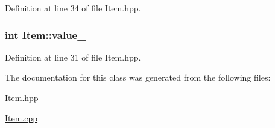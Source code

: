 Definition at line 34 of file Item.\-hpp.

\hypertarget{class_item_aab4eafdc2cc91135a58cd5451af637b3}{
\subsubsection[{value\-\_\-}]{\setlength{\rightskip}{0pt plus 5cm}int Item\-::value\-\_\-\hspace{0.3cm}{\ttfamily [protected]}}}\label{class_item_aab4eafdc2cc91135a58cd5451af637b3}


Definition at line 31 of file Item.\-hpp.



The documentation for this class was generated from the following files\-:\begin{DoxyCompactItemize}
\item 
\hyperlink{_item_8hpp}{Item.\-hpp}\item 
\hyperlink{_item_8cpp}{Item.\-cpp}\end{DoxyCompactItemize}
